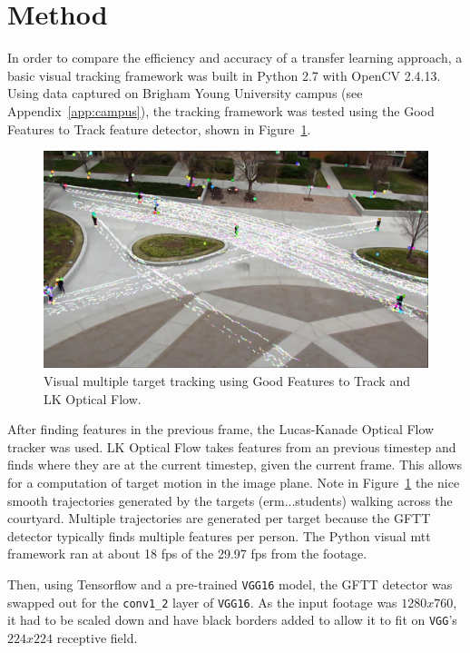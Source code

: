 \documentclass[hidelinks]{article}
\begin{document}

\section{Method}
In order to compare the efficiency and accuracy of a transfer learning approach, a basic visual tracking framework was built in Python 2.7 with OpenCV 2.4.13. Using data captured on Brigham Young University campus (see Appendix~\ref{app:campus}), the tracking framework was tested using the Good Features to Track feature detector, shown in Figure~\ref{fig:visual_mtt_gftt}.

\begin{figure}[H]
  \centering
  \includegraphics[scale=0.27]{visual_mtt_gftt}
  \caption{Visual multiple target tracking using Good Features to Track and LK Optical Flow.}
  \label{fig:visual_mtt_gftt}
\end{figure}

After finding features in the previous frame, the Lucas-Kanade Optical Flow tracker was used. LK Optical Flow takes features from an previous timestep and finds where they are at the current timestep, given the current frame. This allows for a computation of target motion in the image plane. Note in Figure~\ref{fig:visual_mtt_gftt} the nice smooth trajectories generated by the targets (erm...students) walking across the courtyard. Multiple trajectories are generated per target because the GFTT detector typically finds multiple features per person. The Python visual mtt framework ran at about 18 fps of the 29.97 fps from the footage.

Then, using Tensorflow and a pre-trained \texttt{VGG16} model, the GFTT detector was swapped out for the \texttt{conv1\_2} layer of \texttt{VGG16}. As the input footage was $1280x760$, it had to be scaled down and have black borders added to allow it to fit on \texttt{VGG}'s $224x224$ receptive field.
\end{document}
